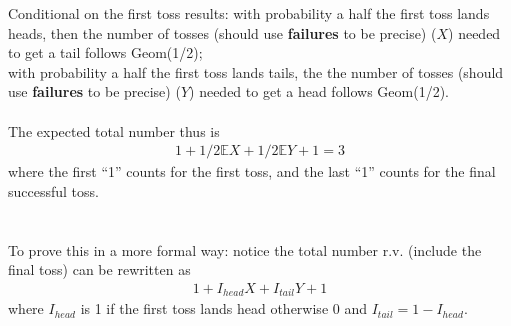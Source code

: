 
\setcounter{theorem}{17}
\begin{exercise} [BH.4.18]
\begin{solution}
    Conditional on the first toss results: with probability a half the first toss lands heads, then the number of tosses (should use \textbf{failures} to be precise) ($X$) needed to get a tail follows Geom(1/2);\\ with probability a half the first toss lands tails, the the number of tosses (should use \textbf{failures} to be precise) ($Y$) needed to get a head follows Geom(1/2). \\~\\
	The expected total number thus is 
	\begin{align*}
		1+ 1/2 \mathbb{E}X + 1/2 \mathbb{E}Y +1  =3
	\end{align*} 
	where the first ``1'' counts for the first toss, and the last ``1'' counts for the final successful toss. \\~\\
	~\\To prove this in a more formal way: notice the total number r.v. (include the final toss) can be rewritten as 
	\begin{align*}
		1 + I_{head} X + I_{tail} Y +1
	\end{align*}
where $I_{head}$ is 1 if the first toss lands head otherwise 0 and $ I_{tail}=1- I_{head}$.	
	

\end{solution}
\end{exercise}
